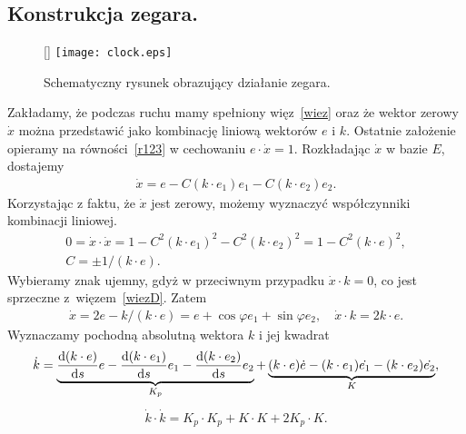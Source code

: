 \subsection{Konstrukcja zegara.}
\begin{wrapfigure}[15]{r}{4cm}
\raisebox{0pt}[\dimexpr{}\baselineskip\relax]{
\texttt{[image: clock.eps]}}
\caption{Schematyczny rysunek obrazujący działanie zegara.}
\label{clock_schemat}
\end{wrapfigure}
Zakładamy, że podczas ruchu mamy spełniony więz~\eqref{wiez}
oraz że wektor zerowy $\dot{x}$ można przedstawić
jako kombinację liniową wektorów $e$ i $k$.
Ostatnie założenie opieramy na równości~\eqref{r123} w cechowaniu 
$e\cdot \dot{x} = 1$.
Rozkładając $\dot{x}$ w bazie $E$, dostajemy
\begin{align*}
\dot{x} = e - C (k\cdot e_1) e_1 - C (k\cdot e_2)e_2.
\end{align*}
Korzystając z faktu, że $\dot{x}$ jest zerowy, możemy wyznaczyć
współczynniki kombinacji liniowej.
\begin{gather*}
0 = \dot{x} \cdot \dot{x} = 1 - C^2 (k\cdot e_1)^2 - C^2 (k\cdot e_2)^2
= 1 - C^2 (k\cdot e)^2, \\
C= \pm 1/(k\cdot e).
\end{gather*}
Wybieramy znak ujemny, gdyż w przeciwnym przypadku
$\dot{x}\cdot k = 0$, co jest sprzeczne z~więzem~\eqref{wiezD}.
 Zatem
\begin{align}
\dot{x} = 2 e - k / (k\cdot e) = 
e + \cos \varphi e_1 + \sin\varphi e_2
,\quad \dot{x}\cdot k = 2 k \cdot e .
\end{align}
Wyznaczamy pochodną absolutną wektora $k$ i jej kwadrat
\begin{align*}
\dot{k} =\underbrace{ \frac{\text{d} (k\cdot e)}{\text{d} s} e - 
\frac{\text{d} (k\cdot e_1)}{\text{d} s}e_1 -
\frac{\text{d} (k\cdot e_2)}{\text{d} s}e_2}_{K_p}
+\underbrace{(k\cdot e)\dot{e} - (k\cdot e_1)\dot{e_1} 
-(k\cdot e_2)\dot{e_2} }_{K} ,
\end{align*}
\begin{align*}
\dot{k}\cdot\dot{k} = K_p\cdot K_p + K\cdot K + 2K_p\cdot K .
\end{align*}

